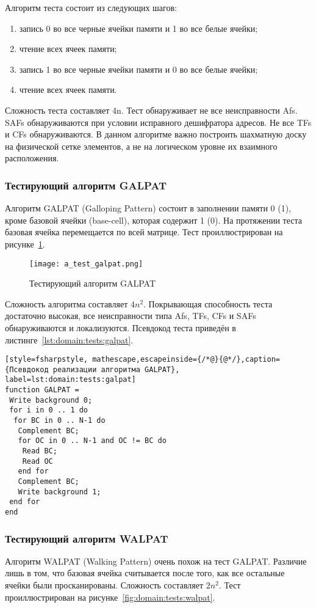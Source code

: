 Алгоритм теста состоит из следующих шагов:
\begin{enumerate}
\item запись 0 во все черные ячейки памяти и 1 во все белые ячейки;
\item чтение всех ячеек памяти;
\item запись 1 во все черные ячейки памяти и 0 во все белые ячейки;
\item чтение всех ячеек памяти.
\end{enumerate}

Сложность теста составляет 4n. Тест обнаруживает не все неисправности Afs. SAFs обнаруживаются при условии исправного дешифратора адресов. Не все TFs и CFs обнаруживаются. В данном алгоритме важно построить шахматную доску на физической сетке элементов, а не на логическом уровне их взаимного расположения.

\subsubsection{Тестирующий алгоритм GALPAT}
\label{sub:domain:tests:galpat}
Алгоритм GALPAT (Galloping Pattern) состоит в заполнении памяти 0 (1), кроме базовой ячейки (base-cell), которая содержит 1 (0). На протяжении теста базовая ячейка перемещается по всей матрице. Тест проиллюстрирован на рисунке~\ref{fig:domain:tests:galpat}.

\begin{figure}[ht]
\centering
  \texttt{[image: a\_test\_galpat.png]}  
  \caption{Тестирующий алгоритм GALPAT}
  \label{fig:domain:tests:galpat}
\end{figure}

Сложность алгоритма составляет $ 4n^{2} $. Покрывающая способность теста достаточно высокая, все неисправности типа Afs, TFs, CFs и SAFs обнаруживаются и локализуются. Псевдокод теста приведён в листинге~\ref{lst:domain:tests:galpat}.

\begin{lstlisting}[style=fsharpstyle, mathescape,escapeinside={/*@}{@*/},caption={Псевдокод реализации алгоритма GALPAT}, label=lst:domain:tests:galpat]
function GALPAT =
 Write background 0;
 for i in 0 .. 1 do
  for BC in 0 .. N-1 do
   Complement BC;
   for OC in 0 .. N-1 and OC != BC do
    Read BC;
    Read OC
   end for
   Complement BC;
   Write background 1;
 end for
end
\end{lstlisting}

\subsubsection{Тестирующий алгоритм WALPAT}
\label{sub:domain:tests:walpat}
Алгоритм WALPAT (Walking Pattern) очень похож на тест GALPAT. Различие лишь в том, что базовая ячейка считывается после того, как все остальные ячейки были просканированы. Сложность составляет $ 2n^{2} $. Тест проиллюстрирован на рисунке~\ref{fig:domain:tests:walpat}.

